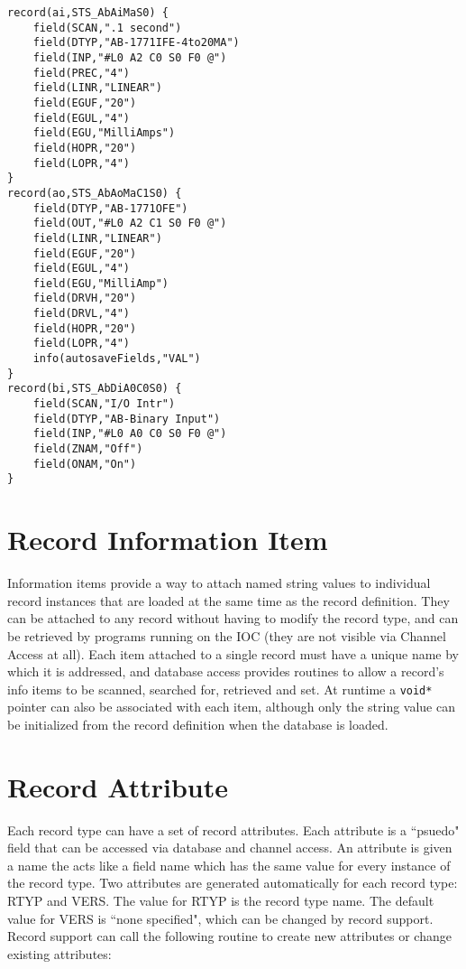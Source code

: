 \begin{verbatim}
record(ai,STS_AbAiMaS0) {
    field(SCAN,".1 second")
    field(DTYP,"AB-1771IFE-4to20MA")
    field(INP,"#L0 A2 C0 S0 F0 @")
    field(PREC,"4")
    field(LINR,"LINEAR")
    field(EGUF,"20")
    field(EGUL,"4")
    field(EGU,"MilliAmps")
    field(HOPR,"20")
    field(LOPR,"4")
}
record(ao,STS_AbAoMaC1S0) {
    field(DTYP,"AB-1771OFE")
    field(OUT,"#L0 A2 C1 S0 F0 @")
    field(LINR,"LINEAR")
    field(EGUF,"20")
    field(EGUL,"4")
    field(EGU,"MilliAmp")
    field(DRVH,"20")
    field(DRVL,"4")
    field(HOPR,"20")
    field(LOPR,"4")
    info(autosaveFields,"VAL")
}
record(bi,STS_AbDiA0C0S0) {
    field(SCAN,"I/O Intr")
    field(DTYP,"AB-Binary Input")
    field(INP,"#L0 A0 C0 S0 F0 @")
    field(ZNAM,"Off")
    field(ONAM,"On")
}
\end{verbatim}

\section{Record Information Item}

Information items provide a way to attach named string values to individual record instances that are loaded at the same 
time as the record definition. They can be attached to any record without having to modify the record type, and can be 
retrieved by programs running on the IOC (they are not visible via Channel Access at all). Each item attached to a single 
record must have a unique name by which it is addressed, and database access provides routines to allow a record's info 
items to be scanned, searched for, retrieved and set. At runtime a \verb|void*| pointer can also be associated with each item, 
although only the string value can be initialized from the record definition when the database is loaded.

\section{Record Attribute}

Each record type can have a set of record attributes. Each attribute is a ``psuedo" field that can be accessed via database 
and channel access. An attribute is given a name the acts like a field name which has the same value for every instance of 
the record type. Two attributes are generated automatically for each record type: RTYP and VERS. The value for RTYP is 
the record type name. The default value for VERS is ``none specified", which can be changed by record support. Record 
support can call the following routine to create new attributes or change existing attributes:

